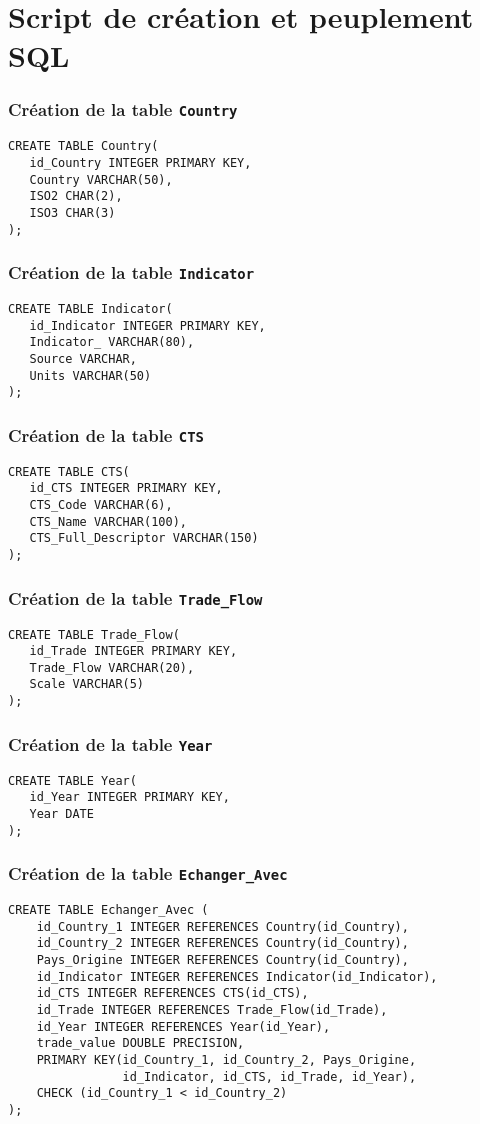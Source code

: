 \documentclass[11pt]{beamer}
\begin{document}
\section{Script de création et peuplement SQL}
\begin{frame}[fragile]
  \frametitle{Création de la table \texttt{Country}}
\begin{verbatim}
CREATE TABLE Country(
   id_Country INTEGER PRIMARY KEY,
   Country VARCHAR(50),
   ISO2 CHAR(2),
   ISO3 CHAR(3)
);
\end{verbatim}
\end{frame}

\begin{frame}[fragile]
  \frametitle{Création de la table \texttt{Indicator}}
\begin{verbatim}
CREATE TABLE Indicator(
   id_Indicator INTEGER PRIMARY KEY,
   Indicator_ VARCHAR(80),
   Source VARCHAR,
   Units VARCHAR(50)
);
\end{verbatim}
\end{frame}

\begin{frame}[fragile]
  \frametitle{Création de la table \texttt{CTS}}
\begin{verbatim}
CREATE TABLE CTS(
   id_CTS INTEGER PRIMARY KEY,
   CTS_Code VARCHAR(6),
   CTS_Name VARCHAR(100),
   CTS_Full_Descriptor VARCHAR(150)
);
\end{verbatim}
\end{frame}

\begin{frame}[fragile]
  \frametitle{Création de la table \texttt{Trade\_Flow}}
\begin{verbatim}
CREATE TABLE Trade_Flow(
   id_Trade INTEGER PRIMARY KEY,
   Trade_Flow VARCHAR(20),
   Scale VARCHAR(5)
);
\end{verbatim}
\end{frame}

\begin{frame}[fragile]
  \frametitle{Création de la table \texttt{Year}}
\begin{verbatim}
CREATE TABLE Year(
   id_Year INTEGER PRIMARY KEY,
   Year DATE
);
\end{verbatim}
\end{frame}

\begin{frame}[fragile]
  \frametitle{Création de la table \texttt{Echanger\_Avec}}
\begin{verbatim}
CREATE TABLE Echanger_Avec (
    id_Country_1 INTEGER REFERENCES Country(id_Country),
    id_Country_2 INTEGER REFERENCES Country(id_Country),
    Pays_Origine INTEGER REFERENCES Country(id_Country),
    id_Indicator INTEGER REFERENCES Indicator(id_Indicator),
    id_CTS INTEGER REFERENCES CTS(id_CTS),
    id_Trade INTEGER REFERENCES Trade_Flow(id_Trade),
    id_Year INTEGER REFERENCES Year(id_Year),
    trade_value DOUBLE PRECISION,
    PRIMARY KEY(id_Country_1, id_Country_2, Pays_Origine,
                id_Indicator, id_CTS, id_Trade, id_Year),
    CHECK (id_Country_1 < id_Country_2)
);
\end{verbatim}
\end{frame}
\end{document}
